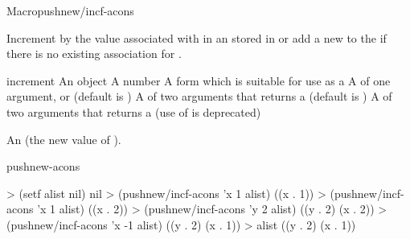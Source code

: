 \documentclass[10pt,twoside,english,pdftex]{article}
\begin{document}
\begin{functiondoc}{Macro}{pushnew/incf-acons}{  
    \returns{} }
%
%
%
%
  
\fnsyntax

\fnpurpose Increment by  the value associated with
 in an  stored in  or
add a new   to the
 if there is no existing association for
.

\fnpackage {}

\fnmodule {}

\fnargs
\begin{args}{increment}
\arg[item] An object
\arg[increment] A number
\arg[place] A form which is suitable for use as a
\arg[key] A  of one argument, or \nil{} (default is \nil)
\arg[test] A  of two arguments that returns a
 (default is ) 
 A  of two arguments that returns a
 (use of  is deprecated)
\end{args}

\fnreturns An  (the new value of
). 

\begin{alsos}{pushnew-acons}
\end{alsos}

\fnexamples
\begin{example}
> (setf alist nil)
nil
> (pushnew/incf-acons 'x 1 alist)
((x . 1))
> (pushnew/incf-acons 'x 1 alist)
((x . 2))
> (pushnew/incf-acons 'y 2 alist)
((y . 2) (x . 2))
> (pushnew/incf-acons 'x -1 alist)
((y . 2) (x . 1))
> alist
((y . 2) (x . 1))
\end{example}

\end{functiondoc}

\end{document}
